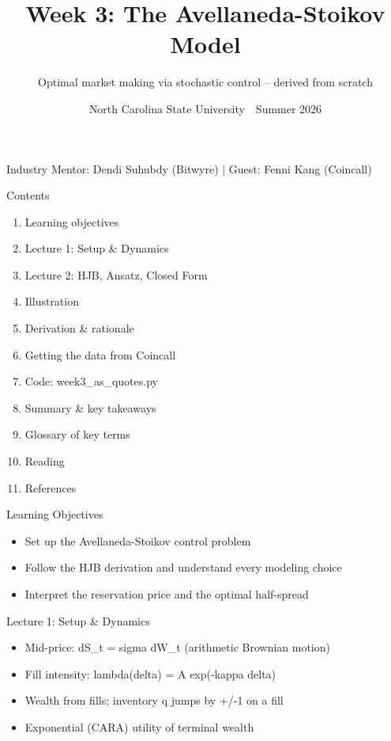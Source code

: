 \documentclass[aspectratio=169,10pt]{beamer}
\title{Week 3: The Avellaneda-Stoikov Model}
\subtitle{Optimal market making via stochastic control -- derived from scratch}
\date{North Carolina State University \,\textbar\, Summer 2026}
\begin{document}
\begin{frame}[plain]\titlepage\begin{center}\tiny Industry Mentor: Dendi Suhubdy (Bitwyre)  |  Guest: Fenni Kang (Coincall)\end{center}\end{frame}
\begin{frame}{Contents}
\small\begin{enumerate}\setlength{\itemsep}{3pt}
  \item Learning objectives
  \item Lecture 1: Setup \& Dynamics
  \item Lecture 2: HJB, Ansatz, Closed Form
  \item Illustration
  \item Derivation \& rationale
  \item Getting the data from Coincall
  \item Code: week3\_as\_quotes.py
  \item Summary \& key takeaways
  \item Glossary of key terms
  \item Reading
  \item References
\end{enumerate}
\end{frame}

\begin{frame}{Learning Objectives}
\begin{itemize}
  \item Set up the Avellaneda-Stoikov control problem
  \item Follow the HJB derivation and understand every modeling choice
  \item Interpret the reservation price and the optimal half-spread
\end{itemize}
\end{frame}

\begin{frame}{Lecture 1: Setup \& Dynamics}
\begin{itemize}
  \item Mid-price: dS\_t = sigma dW\_t  (arithmetic Brownian motion)
  \item Fill intensity: lambda(delta) = A exp(-kappa delta)
  \item Wealth from fills; inventory q jumps by +/-1 on a fill
  \item Exponential (CARA) utility of terminal wealth
\end{itemize}
\end{frame}
\end{document}
